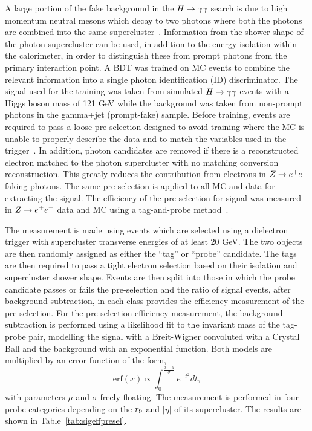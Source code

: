 A large portion of the fake background in the $H\rightarrow\gamma\gamma$ search is due to high momentum neutral mesons
which decay to two photons where both the photons are combined into the same supercluster~\citep{HIG-11-033}. 
Information from the shower shape of the photon supercluster can be used, in addition to the 
energy isolation within the calorimeter, in order to distinguish these from prompt photons
from the primary interaction point. A BDT was trained on MC events to combine the relevant information
into a single photon identification (ID) discriminator. The signal used for the training was taken from 
simulated $H\rightarrow\gamma\gamma$ events with a Higgs boson mass of 121 GeV while the background was 
taken from non-prompt photons in the gamma+jet (prompt-fake) sample.
Before training, events are required to pass a loose pre-selection designed to avoid training 
where the MC is unable to properly describe the data and to match the variables used in the trigger~\citep{AN-12-048}.
In addition, photon candidates are removed if there is a reconstructed electron matched to the 
photon supercluster with no matching conversion reconstruction. This greatly reduces the contribution
from electrons in $Z\rightarrow e^{+}e^{-}$ faking photons. The same pre-selection is applied to all MC and data for extracting the signal.
The efficiency of the pre-selection for signal was measured in $Z\rightarrow e^{+}e^{-}$ data and MC using a tag-and-probe 
method~\citep{AN-12-116}. 

The measurement is made using events which are selected using a dielectron
trigger with supercluster transverse energies of at least 20 GeV. The two objects are then 
randomly assigned as either the ``tag'' or ``probe'' candidate. The tags are then required to 
pass a tight electron selection based on their isolation and supercluster shower shape.
Events are then split into those in which the probe candidate passes or fails the pre-selection
and the ratio of signal events, after background subtraction, in each class provides the 
efficiency measurement of the pre-selection. For the pre-selection efficiency measurement, 
the background subtraction is performed using a likelihood fit to the invariant 
mass of the tag-probe pair, modelling the signal with a Breit-Wigner convoluted with a 
Crystal Ball and the background with an exponential function. 
Both models are multiplied by an error function of the form,
\begin{equation}
\mathrm{erf}(x)\propto \int_{0}^{\frac{x-\mu}{\sigma}} e^{-t^{2}}dt,
\end{equation}
with parameters $\mu$ and $\sigma$ freely floating. The measurement is performed
in four probe categories depending on the $r_{9}$ and $|\eta|$ of its supercluster.
The results are shown in Table~\ref{tab:sigeffpresel}. 

